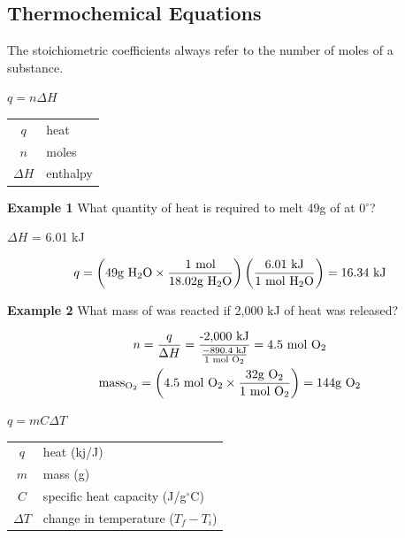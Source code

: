 \documentclass[11pt]{article}
\begin{document}
    \subsection{Thermochemical Equations}
    The stoichiometric coefficients always refer to the number of moles of a substance.

    \begin{center}
        $\boxed{q = n\Delta H}$
    \end{center}

    \begin{center}
        \begin{tabular}{c l}
        $q$ & heat \\
        $n$ & moles \\
        $\Delta H$ & enthalpy
        \end{tabular}
    \end{center}

    \textbf{Example 1} What quantity of heat is required to melt 49g of  at 0$^\circ$?

    \begin{center}
         $\Delta H$ = 6.01 kJ

        \begin{equation*}
            q = \left(\text{49g \ce{H2O}} \times \frac{\text{1 mol}}{\text{18.02g \ce{H2O}}}\right) \left(\frac{\text{6.01 kJ}}{\text{1 mol \ce{H2O}}}\right) = \text{16.34 kJ}
        \end{equation*}
    \end{center}

    \textbf{Example 2} What mass of  was reacted if 2,000 kJ of heat was released?

    \begin{center}
        \begin{equation*}
            \begin{gathered}
                n = \frac{q}{\Delta H} = \frac{\text{-2,000 kJ}}{\frac{-890.4 \text{ kJ}}{1 \text{ mol \ce{O2}}}} = 4.5 \text{ mol \ce{O2}} \\
                \text{mass}_{\ce{O2}} = \left(4.5 \text{ mol \ce{O2}} \times \frac{32\text{g \ce{O2}}}{1 \text{ mol \ce{O2}}}\right) = 144\text{g \ce{O2}}
            \end{gathered}
        \end{equation*}
    \end{center}

    \begin{center}
        $\boxed{q = m C\Delta T}$

        \begin{tabular}{c l}
            $q$ & heat (kj/J)\\
            $m$ & mass (g) \\
            $C$ & specific heat capacity (J/g$^\circ$C) \\
            $\Delta T$ & change in temperature ($T_{f} - T_{i}$)
        \end{tabular}
    \end{center}
\end{document}
